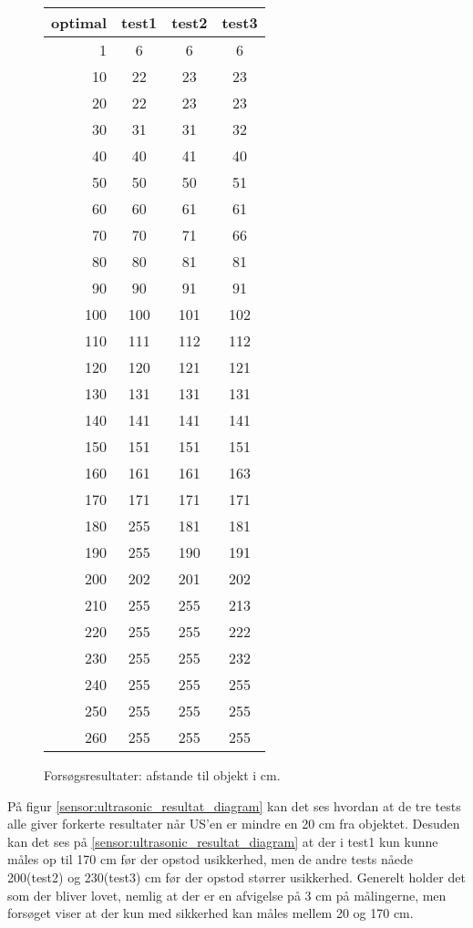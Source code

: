 \begin{figure}[h]
\centering
\begin{tabular}{r | c | c | c |}
optimal & test1 & test2 & test3 \\
\hline
1 & 6 & 6 & 6 \\
10&	22&	23&	23\\
20&	22&	23&	23\\
30&	31&	31&	32\\
40&	40&	41&	40\\
50&	50&	50&	51\\
60&	60&	61&	61\\
70&	70&	71&	66\\
80&	80&	81&	81\\
90&	90&	91&	91\\
100&	100&	101&	102\\
110&	111&	112&	112\\
120&	120&	121&	121\\
130&	131&	131&	131\\
140&	141&	141&	141\\
150&	151&	151&	151\\
160&	161&	161&	163\\
170&	171&	171&	171\\
180&	255&	181&	181\\
190&	255&	190&	191\\
200&	202&	201&	202\\
210&	255&	255&	213\\
220&	255&	255&	222\\
230&	255&	255&	232\\
240&	255&	255&	255\\
250&	255&	255&	255\\
260&	255&	255&	255\\
\end{tabular}
\caption{Forsøgsresultater: afstande til objekt i cm.}
\label{sensor:ultrasonic_test_data}
\end{figure}

På figur \ref{sensor:ultrasonic_resultat_diagram} kan det ses hvordan at de tre tests alle giver forkerte resultater når US'en er mindre en 20 cm fra objektet.
Desuden kan det ses på \ref{sensor:ultrasonic_resultat_diagram} at der i test1 kun kunne måles op til 170 cm før der opstod usikkerhed, men de andre tests nåede 200(test2) og 230(test3) cm før der opstod størrer usikkerhed.
Generelt holder det som der bliver lovet, nemlig at der er en afvigelse på 3 cm på målingerne, men forsøget viser at der kun med sikkerhed kan måles mellem 20 og 170 cm.

